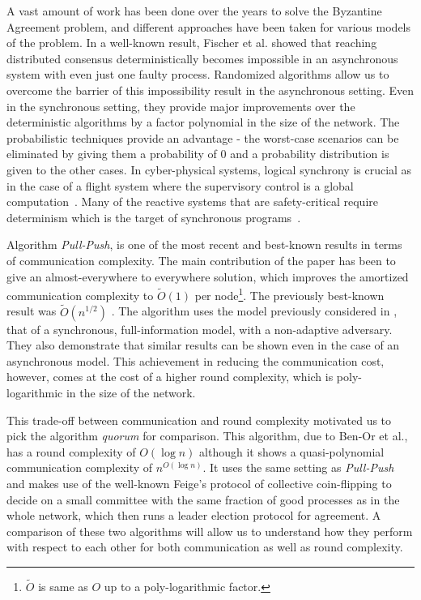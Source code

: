 A vast amount of work has been done over the years to solve the Byzantine
Agreement problem, and different approaches have been taken for various models
of the problem. In a well-known result, Fischer et al. \cite{FischerLP83}
showed that reaching distributed consensus deterministically becomes impossible
in an asynchronous system with even just one faulty process. Randomized
algorithms allow us to overcome the barrier of this impossibility result in the
asynchronous setting. Even in the synchronous setting, they provide major
improvements over the deterministic algorithms by a factor polynomial in the
size of the network. The probabilistic techniques provide an advantage - the
worst-case scenarios can be eliminated by giving them a probability of $0$ and
a probability distribution is given to the other cases. In cyber-physical
systems, logical synchrony is crucial as in the case of a flight system where
the supervisory control is a global computation~\cite{SASMO}.  Many of the
reactive systems that are safety-critical require determinism which is the
target of synchronous programs~\cite{MVF00, LH94}.


Algorithm \textit{Pull-Push}, is one of the most recent and best-known results
in terms of communication complexity. The main contribution of the paper has
been to give an almost-everywhere to everywhere solution, which improves the
amortized communication complexity to $\tilde{O}(1)$ per
node\footnote{$\tilde{O}$ is same as $O$ up to a poly-logarithmic factor.}. The
previously best-known result was $\tilde{O}(n^{1/2})$ \cite{KLST11}.  The
algorithm uses the model previously considered in
\cite{KLST11,KSSV06,BPV06,KS09}, that of a synchronous, full-information model,
with a non-adaptive adversary. They also demonstrate that similar results can
be shown even in the case of an asynchronous model. This achievement in
reducing the communication cost, however, comes at the cost of a higher round
complexity, which is poly-logarithmic in the size of the network. 

This trade-off between communication and round complexity motivated us to pick
the algorithm \textit{quorum} for comparison. This algorithm, due to Ben-Or et
al., has a round complexity of $O(\log n)$ although it shows a quasi-polynomial
communication complexity of $n^{O(\log n)}$.  It uses the same setting as
\textit{Pull-Push} and makes use of the well-known Feige's protocol of
collective coin-flipping to decide on a small committee with the same fraction
of good processes as in the whole network, which then runs a leader election
protocol for agreement. A comparison of these two algorithms will allow us to
understand how they perform with respect to each other for both communication
as well as round complexity. 

